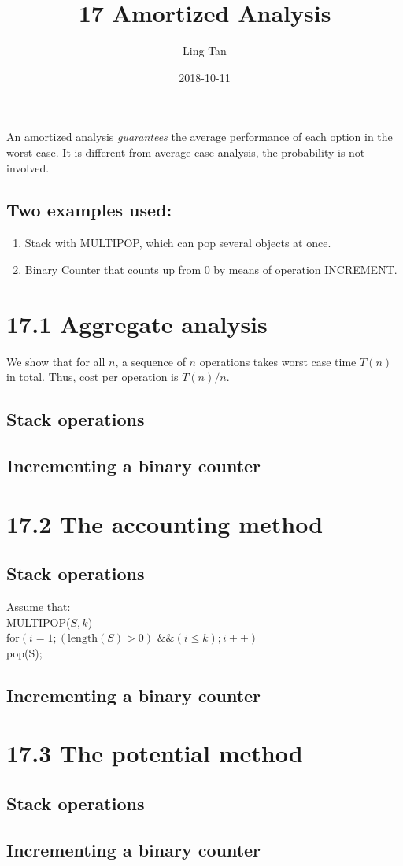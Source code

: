 \documentclass[a4paper]{article}
\title{17 Amortized Analysis}
\author{Ling Tan}
\date{2018-10-11}
\begin{document}
\maketitle
An amortized analysis \textit{guarantees} the average performance of each option in the worst case. It is different from average case analysis, the probability is not involved.

\subsection*{Two examples used:}
\begin{enumerate}
    \item Stack with MULTIPOP, which can pop several objects at once.
    \item Binary Counter that counts up from 0 by means of operation INCREMENT.
\end{enumerate}
\section*{17.1 Aggregate analysis}
We show that for all $n$, a sequence of $n$ operations takes worst case time $T(n)$ in total. Thus, cost per operation is $T(n)/n$.

\subsection*{Stack operations}
\subsection*{Incrementing a binary counter}

\section*{17.2 The accounting method}
\subsection*{Stack operations}
Assume that:\\
\hspace*{1em} MULTIPOP($S,k$)\\
\hspace*{1em}    for$(i=1; (\text{length}(S)>0)\text{ \&\& }(i\leq k);i++)$\\
\hspace*{2em}    pop(S);

\subsection*{Incrementing a binary counter}

\section*{17.3 The potential method}
\subsection*{Stack operations}
\subsection*{Incrementing a binary counter}
\end{document}
